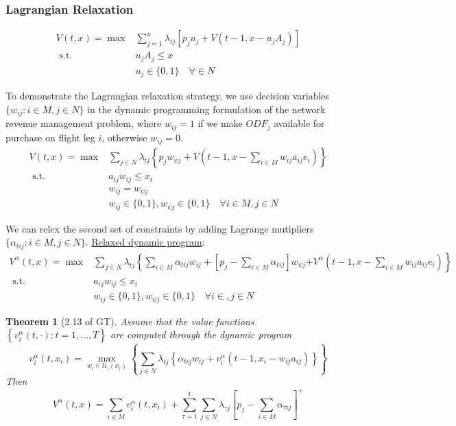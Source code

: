 \documentclass[11pt,a4paper]{article}
\newtheorem{theorem}{Theorem}
\begin{document}
\subsubsection{Lagrangian Relaxation}
$$\begin{array}{cl}
    V(t, x)=\max & \sum_{j=1}^n\lambda_{tj}[p_ju_j+V(t-1,x-u_jA_j)] \\
    \text { s.t. } \quad & u_jA_j \leq x \\
    & u_{j} \in\{0,1\} \quad \forall \in N
\end{array}$$

To demonstrate the Lagrangian relaxation strategy, we use decision variables $\{w_{ij} : i \in M, j \in N\}$ in the dynamic programming formulation of the network revenue management problem, where $w_{ij} = 1$ if we make ${ODF}_j$ available for purchase on flight leg $i$, otherwise $w_{ij} = 0$.
$$\begin{array}{cl}
    V(t, x)=\max & \sum_{j \in N} \lambda_{t j}\left\{p_{j} w_{\psi j}+V\left(t-1, x-\sum_{i \in M} w_{i j} a_{i j} e_{i}\right)\right\} \\
    \text { s.t. } \quad & a_{i j} w_{i j} \leq x_{i} \\
    & w_{i j}=w_{\psi j} \\
    & w_{i j} \in\{0,1\}, w_{\psi j} \in\{0,1\} \quad \forall i \in M, j \in N
\end{array}$$

We can relex the second set of constraints by adding Lagrange mutipliers $\{\alpha_{tij} : i \in M, j \in N\}$.
\underline{Relaxed dynamic program}:
$$\begin{array}{cl}
    V^{\alpha}(t, x)=\max& \sum_{j \in N} \lambda_{t j}\left\{\sum_{i \in M} \alpha_{t i j} w_{i j}+\left[p_{j}-\sum_{i \in M} \alpha_{t i j}\right] w_{\psi j}\right.
    \left.+V^{\alpha}\left(t-1, x-\sum_{i \in M} w_{i j} a_{i j} e_{i}\right)\right\} \\
    \text { s.t. } \quad & a_{i j} w_{i j} \leq x_{i} \\
    & w_{i j} \in\{0,1\}, w_{\psi j} \in\{0,1\} \quad \forall i \in, j \in N
\end{array}$$

\begin{theorem}[2.13 of GT]
    Assume that the value functions $\left\{v_{i}^{\alpha}(t, \cdot): t=1, \ldots, T\right\}$ are computed through the dynamic program
$$
v_{i}^{\alpha}\left(t, x_{i}\right)=\max _{w_{i} \in \mathcal{U}_{i}\left(x_{i}\right)}\left\{\sum_{j \in N} \lambda_{t j}\left\{\alpha_{t i j} w_{i j}+v_{i}^{\alpha}\left(t-1, x_{i}-w_{i j} a_{i j}\right)\right\}\right\}
$$
Then
$$
V^{\alpha}(t, x)=\sum_{i \in M} v_{i}^{\alpha}\left(t, x_{i}\right)+\sum_{\tau=1}^{t} \sum_{j \in N} \lambda_{\tau j}\left[p_{j}-\sum_{i \in M} \alpha_{\tau i j}\right]^{+}
$$
\end{theorem}
\end{document}

